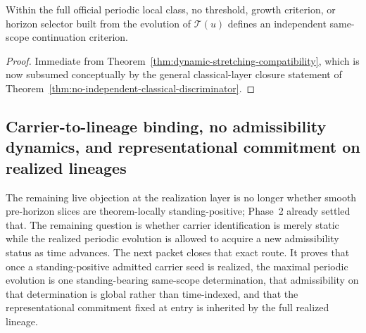 \begin{corollary}
\label{cor:no-stretching-based-continuation-gate}
Within the full official periodic local class, no threshold, growth criterion, or horizon selector built
from the evolution of $\mathcal T(u)$ defines an independent same-scope continuation criterion.
\end{corollary}

\begin{proof}
Immediate from Theorem~\ref{thm:dynamic-stretching-compatibility}, which is now subsumed conceptually by the general classical-layer closure statement of Theorem~\ref{thm:no-independent-classical-discriminator}.
\end{proof}

\subsection{Carrier-to-lineage binding, no admissibility dynamics, and representational commitment on realized lineages}
\label{subsec:standing-conservation-realized-lineages}
The remaining live objection at the realization layer is no longer whether smooth pre-horizon slices are theorem-locally standing-positive; Phase~2 already settled that. The remaining question is whether carrier identification is merely static while the realized periodic evolution is allowed to acquire a new admissibility status as time advances. The next packet closes that exact route. It proves that once a standing-positive admitted carrier seed is realized, the maximal periodic evolution is one standing-bearing same-scope determination, that admissibility on that determination is global rather than time-indexed, and that the representational commitment fixed at entry is inherited by the full realized lineage.

